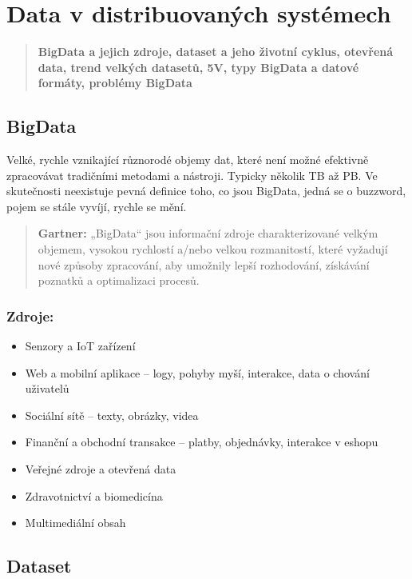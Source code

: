 \section{Data v distribuovaných systémech} 
\begin{quote}
    \textbf{BigData a jejich zdroje, dataset a jeho životní cyklus, otevřená data, trend velkých datasetů, 5V, typy BigData a datové formáty, problémy BigData}
\end{quote}

\subsection{BigData}
Velké, rychle vznikající různorodé objemy dat, které není možné efektivně zpracovávat tradičními metodami a nástroji.
Typicky několik TB až PB. Ve skutečnosti neexistuje pevná definice toho, co jsou
BigData, jedná se o buzzword, pojem se stále vyvíjí, rychle se mění.

\begin{quote}
    \textbf{Gartner:} „BigData“ jsou informační zdroje charakterizované velkým objemem, vysokou rychlostí a/nebo velkou rozmanitostí,
které vyžadují nové způsoby zpracování, aby umožnily lepší rozhodování, získávání poznatků a optimalizaci procesů.
\end{quote}

\subsubsection{Zdroje:}
\begin{itemize}
    \item Senzory a IoT zařízení
    \item Web a mobilní aplikace -- logy, pohyby myší, interakce, data o chování 
    uživatelů
    \item Sociální sítě -- texty, obrázky, videa
    \item Finanční a obchodní transakce -- platby, objednávky, interakce v eshopu
    \item Veřejné zdroje a otevřená data
    \item Zdravotnictví a biomedicína
    \item Multimediální obsah
\end{itemize}

\subsection{Dataset}

